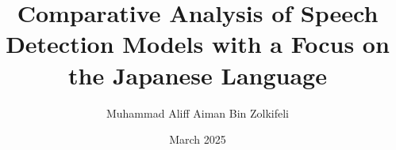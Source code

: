 \newtheorem{theorem}{Theorem}[chapter]
\newtheorem{corollary}{Corollary}[theorem]
\newtheorem{lemma}[theorem]{Lemma}
\newtheorem{remark}{Remark}[chapter]
\theoremstyle{definition}\newtheorem{definition}{Definition}[section]
\newtheorem{example}{Example}[chapter]
\newenvironment{solution}{%
    \let\oldqedsymbol=\qedsymbol%
    \def\@addpunct##1{}%
    \renewcommand{\qedsymbol}{$\blacktriangleleft$}%
    \begin{proof}[\bfseries\upshape Solution]}%
    {\end{proof}%
    \renewcommand{\qedsymbol}{\oldqedsymbol}}
            
\title{Comparative Analysis of Speech Detection Models with a Focus on the Japanese Language}
\author{Muhammad Aliff Aiman Bin Zolkifeli}
\date{March 2025}







\makeatletter
{}
\makeatother
